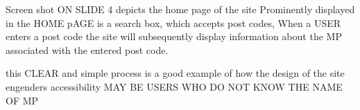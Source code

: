 Screen shot ON SLIDE 4 depicts the home page of the site
Prominently displayed in the HOME pAGE is a search box, which accepts post codes,
When a USER enters a post code the site will subsequently display information about the MP associated with the entered post code.

this CLEAR and simple process is a good example of how the design of the site engenders accessibility
  MAY BE USERS WHO DO NOT KNOW THE NAME OF MP